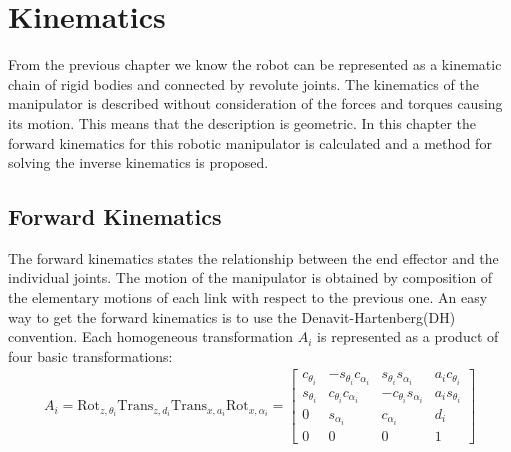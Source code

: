 \chapter{Kinematics}\label{chap:kinematics}
From the previous chapter we know the robot can be represented as a kinematic chain of rigid bodies and connected by revolute joints\cite{Siciliano}. The kinematics of the manipulator is described without consideration of the forces and torques causing its motion. This means that the description is geometric\cite{spong}. In this chapter the forward kinematics for this robotic manipulator is calculated and a method for solving the inverse kinematics is proposed. 

\section{Forward Kinematics}
The forward kinematics states the relationship between the end effector and the individual joints. The motion of the manipulator is obtained by composition of the elementary motions of each link with respect to the previous one\cite{Siciliano}. An easy way to get the forward kinematics is to use the Denavit-Hartenberg(DH) convention. Each homogeneous transformation $A_i$ is represented as a product of four basic transformations\cite{spong}: 
\begin{align}\label{eq:Ai}
A_i = \text{Rot}_{z,\theta_i}\text{Trans}_{z,d_i}\text{Trans}_{x,a_i}\text{Rot}_{x,\alpha_i}=
    \begin{bmatrix}
        c_{\theta_i} & -s_{\theta_i}c_{\alpha_i} & s_{\theta_i}s_{\alpha_i} & a_ic_{\theta_i}\\
        s_{\theta_i} & c_{\theta_i}c_{\alpha_i} & -c_{\theta_i}s_{\alpha_i} & a_is_{\theta_i}\\
        0 & s_{\alpha_i} & c_{\alpha_i} &d_i\\
        0 & 0 & 0 & 1
    \end{bmatrix}    
\end{align}


